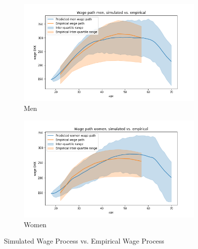 \begin{figure}[ht]

\begin{subfigure}{.5\textwidth}
  \centering
  \includegraphics[width=1\linewidth]{figures/simulated_wage_path_variance_optimized_parameters_women.png}
  \caption{Men}
  \label{fig:sub1}
\end{subfigure}%
\begin{subfigure}{.5\textwidth}
  \centering
  \includegraphics[width=1\linewidth]{figures/simulated_wage_path_variance_optimized_parameters_men.png}
  \caption{Women}
  \label{fig:sub2_wage_path}
\end{subfigure}
    \caption{Simulated Wage Process vs. Empirical Wage Process}
    \label{fig:sim_wage_vs_empirical_wage}
\end{figure}\label{sec:parameter_calibration}

